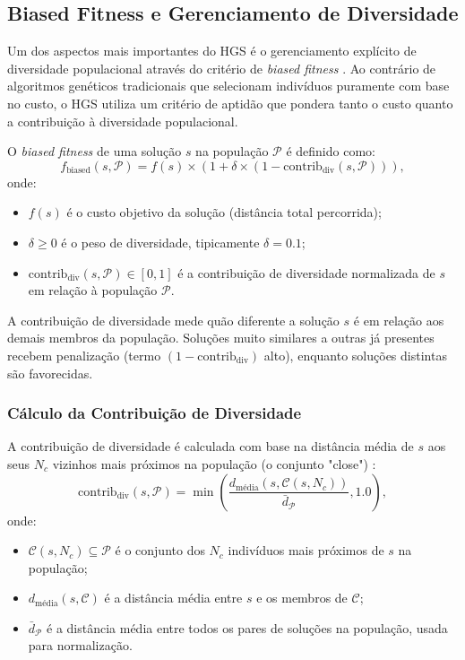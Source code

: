 \subsection{Biased Fitness e Gerenciamento de Diversidade}
\label{subsec:biased_fitness}

Um dos aspectos mais importantes do HGS é o gerenciamento explícito de diversidade populacional através do critério de \emph{biased fitness} \cite{vidal2012hybrid,vidal2013}. Ao contrário de algoritmos genéticos tradicionais que selecionam indivíduos puramente com base no custo, o HGS utiliza um critério de aptidão que pondera tanto o custo quanto a contribuição à diversidade populacional.

O \emph{biased fitness} de uma solução $s$ na população $\mathcal{P}$ é definido como:
\begin{equation}
    f_{\text{biased}}(s, \mathcal{P}) = f(s) \times \left(1 + \delta \times (1 - \text{contrib}_{\text{div}}(s, \mathcal{P}))\right),
    \label{eq:biased_fitness}
\end{equation}
onde:
\begin{itemize}
    \item $f(s)$ é o custo objetivo da solução (distância total percorrida);
    \item $\delta \geq 0$ é o peso de diversidade, tipicamente $\delta = 0.1$;
    \item $\text{contrib}_{\text{div}}(s, \mathcal{P}) \in [0, 1]$ é a contribuição de diversidade normalizada de $s$ em relação à população $\mathcal{P}$.
\end{itemize}

A contribuição de diversidade mede quão diferente a solução $s$ é em relação aos demais membros da população. Soluções muito similares a outras já presentes recebem penalização (termo $(1 - \text{contrib}_{\text{div}})$ alto), enquanto soluções distintas são favorecidas.

\subsubsection{Cálculo da Contribuição de Diversidade}

A contribuição de diversidade é calculada com base na distância média de $s$ aos seus $N_c$ vizinhos mais próximos na população (o conjunto "close") \cite{vidal2013}:
\begin{equation}
    \text{contrib}_{\text{div}}(s, \mathcal{P}) = \min \left( \frac{d_{\text{média}}(s, \mathcal{C}(s, N_c))}{\bar{d}_{\mathcal{P}}}, 1.0 \right),
    \label{eq:contrib_div}
\end{equation}
onde:
\begin{itemize}
    \item $\mathcal{C}(s, N_c) \subseteq \mathcal{P}$ é o conjunto dos $N_c$ indivíduos mais próximos de $s$ na população;
    \item $d_{\text{média}}(s, \mathcal{C})$ é a distância média entre $s$ e os membros de $\mathcal{C}$;
    \item $\bar{d}_{\mathcal{P}}$ é a distância média entre todos os pares de soluções na população, usada para normalização.
\end{itemize}

